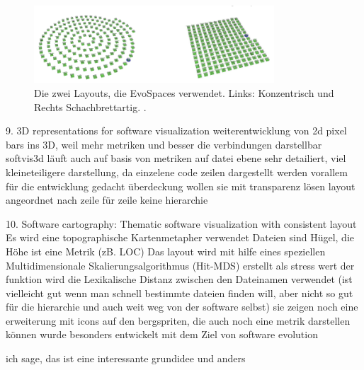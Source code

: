 \begin{figure}
    \centering
    \includegraphics[width=0.8\textwidth]{images/literatur/evoSpaceLayout.png}
    \caption{Die zwei Layouts, die EvoSpaces verwendet. Links: Konzentrisch und Rechts Schachbrettartig. \cite[3]{EvoSpaces}.}
    \label{fig:evoSpaceLayout}
\end{figure}


9. 3D representations for software visualization \cite{3dsoftwareMarcus}
weiterentwicklung von 2d pixel bars ins 3D, weil mehr metriken und besser die verbindungen darstellbar
softvis3d
läuft auch auf basis von metriken auf datei ebene
sehr detailiert, viel kleineteiligere darstellung, da einzelene code zeilen dargestellt werden
vorallem für die entwicklung gedacht
überdeckung wollen sie mit transparenz lösen
layout angeordnet nach zeile für zeile
keine hierarchie


10. Software cartography: Thematic software visualization with consistent layout \cite{softwareCartography}
Es wird eine topographische Kartenmetapher verwendet
Dateien sind Hügel, die Höhe ist eine Metrik (zB. LOC)
Das layout wird mit hilfe eines speziellen Multidimensionale Skalierungsalgorithmus (Hit-MDS) erstellt
als stress wert der funktion wird die Lexikalische Distanz zwischen den Dateinamen verwendet (ist vielleicht gut wenn man schnell bestimmte dateien finden will, aber nicht so gut für die hierarchie und auch weit weg von der software selbst)
sie zeigen noch eine erweiterung mit icons auf den bergspriten, die auch noch eine metrik darstellen können
wurde besonders entwickelt mit dem Ziel von software evolution

ich sage, das ist eine interessante grundidee und anders

